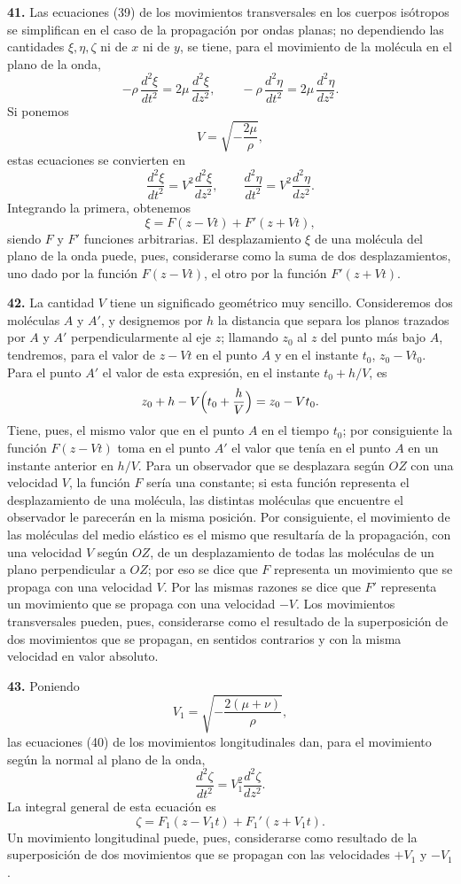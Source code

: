 \noindent\textbf{41.} Las ecuaciones (39) de los movimientos transversales
en los cuerpos isótropos se simplifican en el caso de la propagación por
ondas planas; no dependiendo las cantidades $\xi,\eta,\zeta$ ni de $x$ ni
de $y$, se tiene, para el movimiento de la molécula en el plano de la
onda,
\[
-\rho\,\frac{d^2\xi}{dt^2} = 2\mu\,\frac{d^2\xi}{dz^2},\qquad
-\rho\,\frac{d^2\eta}{dt^2} = 2\mu\,\frac{d^2\eta}{dz^2}.
\]
Si ponemos
\[
V=\sqrt{-\frac{2\mu}{\rho}},
\]
estas ecuaciones se convierten en
\[
\frac{d^2\xi}{dt^2} = V^2\frac{d^2\xi}{dz^2},\qquad
\frac{d^2\eta}{dt^2} = V^2\frac{d^2\eta}{dz^2}.
\]
Integrando la primera, obtenemos
\[
\xi = F(z-Vt) + F'(z+Vt),
\]
siendo $F$ y $F'$ funciones arbitrarias. El desplazamiento $\xi$ de una
molécula del plano de la onda puede, pues, considerarse como la suma de
dos desplazamientos, uno dado por la función $F(z-Vt)$, el otro por la
función $F'(z+Vt)$.

\noindent\textbf{42.} La cantidad $V$ tiene un significado geométrico muy
sencillo. Consideremos dos moléculas $A$ y $A'$, y designemos por $h$ la
distancia que separa los planos trazados por $A$ y $A'$ perpendicularmente
al eje $z$; llamando $z_0$ al $z$ del punto más bajo $A$, tendremos, para
el valor de $z-Vt$ en el punto $A$ y en el instante $t_0$, $z_0-Vt_0$. Para
el punto $A'$ el valor de esta expresión, en el instante $t_0+h/V$, es
\[
z_0+h-V\Bigl(t_0+\frac{h}{V}\Bigr)=z_0-Vt_0.
\]
Tiene, pues, el mismo valor que en el punto $A$ en el tiempo $t_0$; por
consiguiente la función $F(z-Vt)$ toma en el punto $A'$ el valor que tenía
en el punto $A$ en un instante anterior en $h/V$. Para un observador que
se desplazara según $OZ$ con una velocidad $V$, la función $F$ sería una
constante; si esta función representa el desplazamiento de una molécula,
las distintas moléculas que encuentre el observador le parecerán en la
misma posición. Por consiguiente, el movimiento de las moléculas del medio
elástico es el mismo que resultaría de la propagación, con una velocidad
$V$ según $OZ$, de un desplazamiento de todas las moléculas de un plano
perpendicular a $OZ$; por eso se dice que $F$ representa un movimiento que
se propaga con una velocidad $V$. Por las mismas razones se dice que $F'$
representa un movimiento que se propaga con una velocidad $-V$. Los
movimientos transversales pueden, pues, considerarse como el resultado de
la superposición de dos movimientos que se propagan, en sentidos
contrarios y con la misma velocidad en valor absoluto.

\noindent\textbf{43.} Poniendo
\[
V_1=\sqrt{-\frac{2(\mu+\nu)}{\rho}},
\]
las ecuaciones (40) de los movimientos longitudinales dan, para el
movimiento según la normal al plano de la onda,
\[
\frac{d^2\zeta}{dt^2}=V_1^2\frac{d^2\zeta}{dz^2}.
\]
La integral general de esta ecuación es
\[
\zeta = F_1(z-V_1t) + F_1'(z+V_1t).
\]
Un movimiento longitudinal puede, pues, considerarse como resultado de la
superposición de dos movimientos que se propagan con las velocidades
$+V_1$ y $-V_1$.

